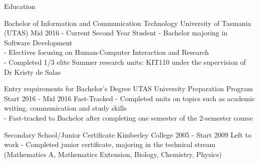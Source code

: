 \begin{tmrsection}{Education}

\tmrdetailentry
    {Bachelor of Information and Communication Technology}
    {University of Tasmania (UTAS)}
    {Mid 2016 - Current}
    {Second Year Student}
    {- Bachelor majoring in Software Development\\
     - Electives focusing on Human-Computer Interaction and Research\\
     - Completed 1/3 elite Summer research units: KIT110 under the supervision of Dr Kristy de Salas}

\tmrdetailentry
    {Entry requirements for Bachelor's Degree}
    {UTAS University Preparation Program}
    {Start 2016 - Mid 2016}
    {Fast-Tracked}
    {- Completed units on topics such as academic writing, communication and study skills\\
     - Fast-tracked to Bachelor after completing one semester of the 2-semester course}
    
\tmrdetailentry
    {Secondary School/Junior Certificate}
	{Kimberley College}
	{2005 - Start 2009}
	{Left to work}
	{- Completed junior certificate, majoring in the technical stream (Mathematics A, Mathematics Extension, Biology, Chemistry, Physics)}
	
\end{tmrsection}